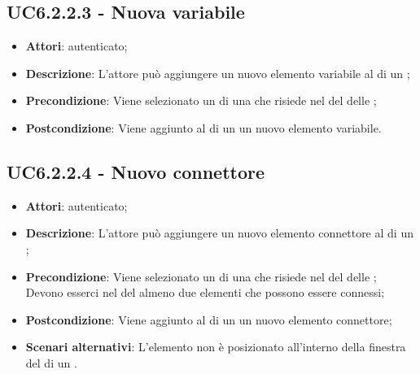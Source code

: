 \subsection{UC6.2.2.3 - Nuova variabile}
\label{ssec:UC6.2.2.3}
\begin{itemize}
\item \textbf{Attori}:  autenticato;
\item \textbf{Descrizione}: L'attore può aggiungere un nuovo elemento variabile al  di un ;
\item \textbf{Precondizione}: Viene selezionato un  di una  che risiede nel  del  delle  ;
\item \textbf{Postcondizione}: Viene aggiunto al  di un  un nuovo elemento variabile.
\end{itemize}
\subsection{UC6.2.2.4 - Nuovo connettore}
\label{ssec:UC6.2.2.4}
\begin{itemize}
\item \textbf{Attori}:  autenticato;
\item \textbf{Descrizione}: L'attore può aggiungere un nuovo elemento connettore al  di un ;
\item \textbf{Precondizione}: Viene selezionato un  di una  che risiede nel  del  delle  ; Devono esserci nel  del  almeno due elementi che possono essere connessi;
\item \textbf{Postcondizione}: Viene aggiunto al  di un  un nuovo elemento connettore;
\item \textbf{Scenari alternativi}: L'elemento non è posizionato all'interno della finestra del  di un .
\end{itemize}
